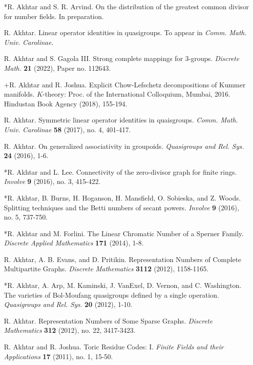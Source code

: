 \documentclass[overlapped,line,letterpaper]{res}
\begin{document}
\begin{resume}
\smallskip
*R. Akhtar and S. R. Arvind.  On the distribution of the greatest common divisor for number fields.  In preparation.

\smallskip
R. Akhtar. Linear operator identities in quasigroups. To appear in {\em Comm. Math. Univ. Carolinae}.

\smallskip
R. Akhtar and S. Gagola III.  Strong complete mappings for $3$-groups.  {\em Discrete Math.} \textbf{21} (2022), Paper no. 112643.

\smallskip
+R. Akhtar and R. Joshua.  Explicit Chow-Lefschetz decompositions of Kummer manifolds.  $K$-theory: Proc. of the International Colloquium, Mumbai, 2016.  Hindustan Book Agency (2018), 155-194.  

\smallskip
R. Akhtar.  Symmetric linear operator identities in quaisgroups.  {\em Comm. Math. Univ. Carolinae} \textbf{58} (2017), no. 4, 401-417.

\smallskip
R. Akhtar.  On generalized associativity in groupoids.  {\em Quasigroups and Rel. Sys.} \textbf{24} (2016), 1-6.

\smallskip
*R. Akhtar and L. Lee.  Connectivity of the zero-divisor graph for finite rings.  {\em Involve } \textbf{9} (2016), no. 3, 415-422.

\smallskip
*R. Akhtar, B. Burns, H. Hoganson, H. Mansfield, O. Sobieska, and Z. Woods.  
Splitting techniques and the Betti numbers of secant powers. {\em Involve} \textbf{9} (2016), no. 5, 737-750.


\smallskip
*R. Akhtar and M. Forlini.  The Linear Chromatic Number of a Sperner 
Family. {\em Discrete Applied Mathematics} \textbf{171} (2014), 1-8.  


\smallskip
R. Akhtar, A. B. Evans, and D. Pritikin.  Representation Numbers of Complete 
Multipartite Graphs.  {\em Discrete Mathematics} \textbf{3112} (2012), 1158-1165.

\smallskip
*R. Akhtar, A. Arp, M. Kaminski, J. VanExel, D. Vernon, and C. Washington. 
The varieties of Bol-Moufang quasigroups defined by a single operation.
{\em Quasigroups and Rel. Sys.} \textbf{20} (2012), 1-10.

\smallskip
R. Akhtar.  Representation Numbers of Some Sparse Graphs. {\em Discrete 
Mathematics} \textbf{312} (2012), no. 22, 3417-3423.

\smallskip
R. Akhtar and R. Joshua.  Toric Residue Codes: I.  {\em Finite Fields and 
their Applications} \textbf{17} (2011), no. 1, 15-50.    



\end{resume}
\end{document}

